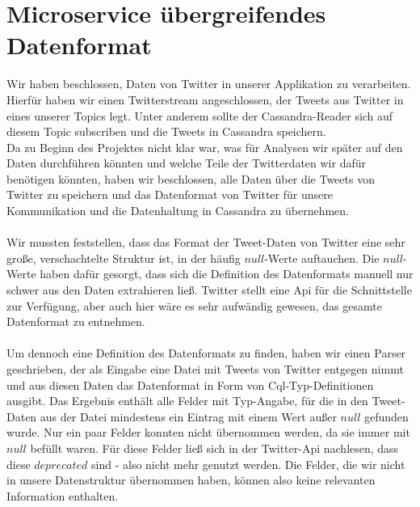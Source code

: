 \section{Microservice übergreifendes Datenformat}
Wir haben beschlossen, Daten von Twitter in unserer Applikation zu verarbeiten. Hierfür haben wir einen Twitterstream angeschlossen, der Tweets aus Twitter in eines unserer Topics legt. Unter anderem sollte der Cassandra-Reader sich auf diesem Topic subscriben und die Tweets in Cassandra speichern.\\
Da zu Beginn des Projektes nicht klar war, was für Analysen wir später auf den Daten durchführen könnten und welche Teile der Twitterdaten wir dafür benötigen könnten, haben wir beschlossen, alle Daten über die Tweets von Twitter zu speichern und das Datenformat von Twitter für unsere Kommunikation und die Datenhaltung in Cassandra zu übernehmen. \\
\\
Wir mussten feststellen, dass das Format der Tweet-Daten von Twitter eine sehr große, verschachtelte Struktur ist, in der häufig $null$-Werte auftauchen. Die $null$-Werte haben dafür gesorgt, dass sich die Definition des Datenformats manuell nur schwer aus den Daten extrahieren ließ. Twitter stellt eine Api für die Schnittstelle zur Verfügung, aber auch hier wäre es sehr aufwändig gewesen, das gesamte Datenformat zu entnehmen.\\
\\
Um dennoch eine Definition des Datenformats zu finden, haben wir einen Parser geschrieben, der als Eingabe eine Datei mit Tweets von Twitter entgegen nimmt und aus diesen Daten das Datenformat in Form von Cql-Typ-Definitionen ausgibt. Das Ergebnis enthält alle Felder mit Typ-Angabe, für die in den Tweet-Daten aus der Datei mindestens ein Eintrag mit einem Wert außer $null$ gefunden wurde. Nur ein paar Felder konnten nicht übernommen werden, da sie immer mit $null$ befüllt waren. Für diese Felder ließ sich in der Twitter-Api nachlesen, dass diese $deprecated$ sind - also nicht mehr genutzt werden. Die Felder, die wir nicht in unsere Datenstruktur übernommen haben, können also keine relevanten Information enthalten.